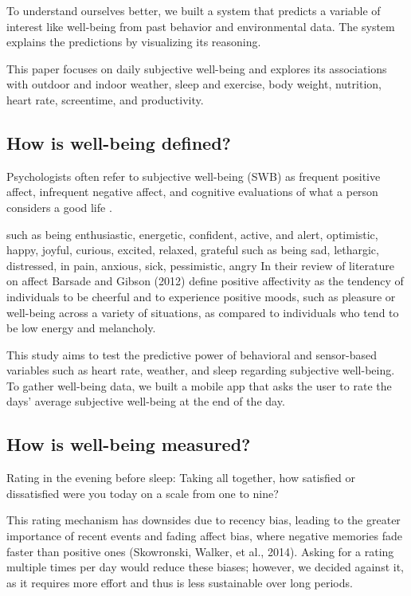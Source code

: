 \documentclass[conference]{IEEEtran}
\begin{document}
To understand ourselves better, we built a system that predicts a variable of interest like well-being from past behavior and environmental data.
The system explains the predictions by visualizing its reasoning. 

This paper focuses on daily subjective well-being and explores its associations with outdoor and indoor weather, sleep and exercise, body weight, nutrition, heart rate, screentime, and productivity.


\subsection{How is well-being defined?}
Psychologists often refer to subjective well-being (SWB) as frequent positive affect, infrequent negative affect, and cognitive evaluations of what a person considers a good life \cite{tov_subjective_2013}.

such as being enthusiastic, energetic, confident, active, and alert, optimistic, happy, joyful, curious, excited, relaxed, grateful
such as being sad, lethargic, distressed, in pain, anxious, sick, pessimistic, angry
In their review of literature on affect Barsade and Gibson (2012) define positive affectivity as the tendency of individuals to be cheerful and to experience positive moods, such as pleasure or well-being across a variety of situations, as compared to individuals who tend to be low energy and melancholy.

This study aims to test the predictive power of behavioral and sensor-based variables such as heart rate, weather, and sleep regarding subjective well-being.
To gather well-being data, we built a mobile app that asks the user to rate the days' average subjective well-being at the end of the day. 

\subsection{How is well-being measured?}
Rating in the evening before sleep:
Taking all together, how satisfied or dissatisfied were you today on a scale from one to nine?

This rating mechanism has downsides due to recency bias, leading to the greater importance of recent events and fading affect bias, where negative memories fade faster than positive ones (Skowronski, Walker, et al., 2014).
Asking for a rating multiple times per day would reduce these biases; however, we decided against it, as it requires more effort and thus is less sustainable over long periods. 
\end{document}
